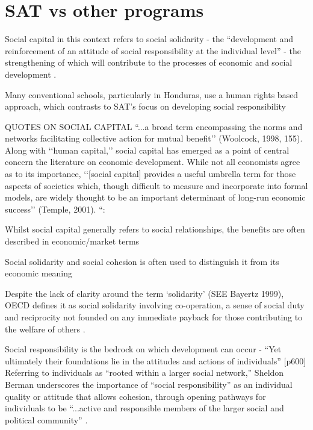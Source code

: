 \section{SAT vs other programs}


Social capital in this context refers to social solidarity - the “development and reinforcement of an attitude of social responsibility at the individual level” - the strengthening of which will contribute to the processes of economic and social development \citep{Honeyman2010}.

Many conventional schools, particularly in Honduras, use a human rights based approach, which contrasts to SAT's focus on developing social responsibility \citep{Honeyman2010}

QUOTES ON SOCIAL CAPITAL “...a broad term encompassing the norms and networks facilitating collective action for mutual benefit’’ (Woolcock, 1998, 155). Along with ‘‘human capital,’’ social capital has emerged as a point of central concern the literature on economic development. While not all economists agree as to its importance, ‘‘[social capital] provides a useful umbrella term for those aspects of societies which, though difficult to measure and incorporate into formal models, are widely thought to be an important determinant of long-run economic success’’ (Temple, 2001). “: \citep{Honeyman2010}


Whilst social capital generally refers to social relationships, the benefits are often described in economic/market terms \citep{Honeyman2010}

Social solidarity and social cohesion is often used to distinguish it from its economic meaning \citep{Honeyman2010}

Despite the lack of clarity around the term `solidarity' (SEE Bayertz 1999), OECD defines it as social solidarity involving co-operation, a sense of social duty and reciprocity not founded on any immediate payback for those contributing to the welfare of others \citep[][p59]{OECD2001}.

Social responsibility is the bedrock on which development can occur - “Yet ultimately their foundations lie in the attitudes and actions of individuals” [p600] Referring to individuals as “rooted within a larger social network,” Sheldon Berman underscores the importance of “social responsibility” as an individual quality or attitude that allows cohesion, through opening pathways for individuals to be “...active and responsible members of the larger social and political community” \citep[][11–12]{Berman1997}.


